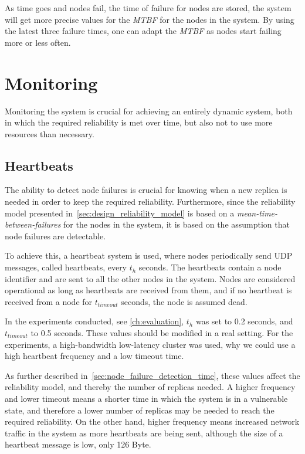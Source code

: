 \documentclass{cslthse-msc}
\begin{document}
As time goes and nodes fail, the time of failure for nodes are stored, the system will get more precise values for the \emph{MTBF} for the nodes in the system. By using the latest three failure times, one can adapt the \emph{MTBF} as nodes start failing more or less often. 


\section{Monitoring} \label{sec:design_monitoring}
Monitoring the system is crucial for achieving an entirely dynamic system, both in which the required reliability is met over time, but also not to use more resources than necessary. 

\subsection{Heartbeats} \label{subsec:heartbeats}
The ability to detect node failures is crucial for knowing when a new replica is needed in order to keep the required reliability. Furthermore, since the reliability model presented in~\cref{sec:design_reliability_model} is based on a \emph{mean-time-between-failures} for the nodes in the system, it is based on the assumption that node failures are detectable. 

To achieve this, a heartbeat system is used, where nodes periodically send UDP messages, called heartbeats, every $t_h$ seconds. The heartbeats contain a node identifier and are sent to all the other nodes in the system. Nodes are considered operational as long as heartbeats are received from them, and if no heartbeat is received from a node for $t_{timeout}$ seconds, the node is assumed dead.

In the experiments conducted, see \cref{ch:evaluation}, $t_h$ was set to 0.2 seconds, and $t_{timeout}$ to 0.5 seconds. These values should be modified in a real setting. For the experiments, a high-bandwidth low-latency cluster was used, why we could use a high heartbeat frequency and a low timeout time.

As further described in~\cref{sec:node_failure_detection_time}, these values affect the reliability model, and thereby the number of replicas needed. A higher frequency and lower timeout means a shorter time in which the system is in a vulnerable state, and therefore a lower number of replicas may be needed to reach the required reliability. On the other hand, higher frequency means increased network traffic in the system as more heartbeats are being sent, although the size of a heartbeat message is low, only 126 Byte.
\end{document}
